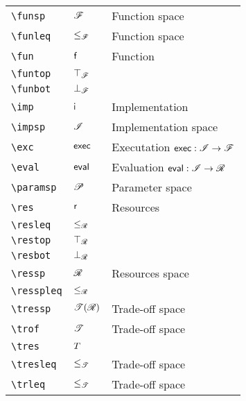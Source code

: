 \begin{longtable}{lll}
 \hline
{\color[rgb]{0.5,0.5,0.5}\texttt{\textbackslash funsp}} & $\mathscr{F}$ &  Function space\\ 
 {\color[rgb]{0.5,0.5,0.5}\texttt{\textbackslash funleq}} & $\leq_{\mathscr{F}}$ &  Function space\\ 
 {\color[rgb]{0.5,0.5,0.5}\texttt{\textbackslash fun}} & $\mathsf{f}$ &  Function\\ 
 {\color[rgb]{0.5,0.5,0.5}\texttt{\textbackslash funtop}} & $\top_{\mathscr{F}}$ & \\ 
 {\color[rgb]{0.5,0.5,0.5}\texttt{\textbackslash funbot}} & $\bot_{\mathscr{F}}$ & \\ 
 {\color[rgb]{0.5,0.5,0.5}\texttt{\textbackslash imp}} & $\mathsf{i}$ &  Implementation\\ 
 {\color[rgb]{0.5,0.5,0.5}\texttt{\textbackslash impsp}} & $\mathscr{I}$ &  Implementation space\\ 
 {\color[rgb]{0.5,0.5,0.5}\texttt{\textbackslash exc}} & $\mathsf{exec}$ &  Executation $\mathsf{exec}: \mathscr{I} \rightarrow \mathscr{F}$\\ 
 {\color[rgb]{0.5,0.5,0.5}\texttt{\textbackslash eval}} & $\mathsf{eval}$ &  Evaluation $\mathsf{eval}: \mathscr{I} \rightarrow \mathscr{R}$\\ 
 {\color[rgb]{0.5,0.5,0.5}\texttt{\textbackslash paramsp}} & $\mathscr{P}$ &  Parameter space\\ 
 {\color[rgb]{0.5,0.5,0.5}\texttt{\textbackslash res}} & $\mathsf{r}$ &  Resources\\ 
 {\color[rgb]{0.5,0.5,0.5}\texttt{\textbackslash resleq}} & $\leq_{\mathscr{R}}$ & \\ 
 {\color[rgb]{0.5,0.5,0.5}\texttt{\textbackslash restop}} & $\top_{\mathscr{R}}$ & \\ 
 {\color[rgb]{0.5,0.5,0.5}\texttt{\textbackslash resbot}} & $\bot_{\mathscr{R}}$ & \\ 
 {\color[rgb]{0.5,0.5,0.5}\texttt{\textbackslash ressp}} & $\mathscr{R}$ &  Resources space\\ 
 {\color[rgb]{0.5,0.5,0.5}\texttt{\textbackslash resspleq}} & $\leq_{\mathscr{R}}$ & \\ 
 {\color[rgb]{0.5,0.5,0.5}\texttt{\textbackslash tressp}} & $\mathscr{T}(\mathscr{R})$ &  Trade-off space\\ 
 {\color[rgb]{0.5,0.5,0.5}\texttt{\textbackslash trof}} & $\mathscr{T}$ &  Trade-off space\\ 
 {\color[rgb]{0.5,0.5,0.5}\texttt{\textbackslash tres}} & $T$ & \\ 
 {\color[rgb]{0.5,0.5,0.5}\texttt{\textbackslash tresleq}} & $\leq_{\mathscr{T}}$ &  Trade-off space\\ 
 {\color[rgb]{0.5,0.5,0.5}\texttt{\textbackslash trleq}} & $\leq_{\mathscr{T}}$ &  Trade-off space\\ 

\end{longtable}
